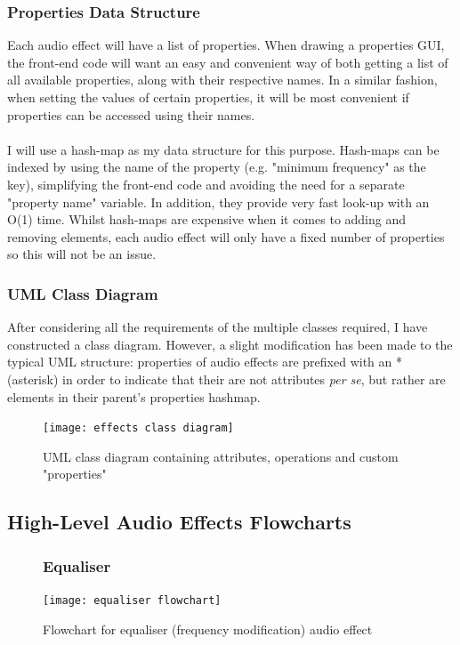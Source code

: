 \subsubsection{Properties Data Structure}
Each audio effect will have a list of properties. When drawing a properties GUI, the front-end code will want an easy and convenient way of both getting a list of all available properties, along with their respective names. In a similar fashion, when setting the values of certain properties, it will be most convenient if properties can be accessed using their names.

\paragraph{}
I will use a hash-map as my data structure for this purpose. Hash-maps can be indexed by using the name of the property (e.g. "minimum frequency" as the key), simplifying the front-end code and avoiding the need for a separate "property name" variable. In addition, they provide very fast look-up with an O(1) time. Whilst hash-maps are expensive when it comes to adding and removing elements, each audio effect will only have a fixed number of properties so this will not be an issue.

\subsubsection{UML Class Diagram}
After considering all the requirements of the multiple classes required, I have constructed a class diagram. However, a slight modification has been made to the typical UML structure: properties of audio effects are prefixed with an * (asterisk) in order to indicate that their are not attributes {\it per se}, but rather are elements in their parent's properties hashmap.

\begin{figure}[h]
	\texttt{[image: effects class diagram]}
	\caption{UML class diagram containing attributes, operations and custom "properties"}
\end{figure}

\pagebreak

\subsection{High-Level Audio Effects Flowcharts}
\begin{figure}[H]
	\subsubsection{Equaliser}
	\texttt{[image: equaliser flowchart]}
	\caption{Flowchart for equaliser (frequency modification) audio effect}
\end{figure}

